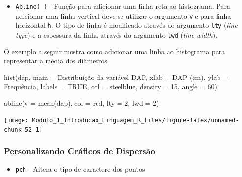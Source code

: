 \documentclass[
]{article}
\newenvironment{Shaded}{\begin{snugshade}}{\end{snugshade}}
\newcommand{\AttributeTok}[1]{\textcolor[rgb]{0.77,0.63,0.00}{#1}}
\newcommand{\ConstantTok}[1]{\textcolor[rgb]{0.00,0.00,0.00}{#1}}
\newcommand{\DecValTok}[1]{\textcolor[rgb]{0.00,0.00,0.81}{#1}}
\newcommand{\FunctionTok}[1]{\textcolor[rgb]{0.00,0.00,0.00}{#1}}
\newcommand{\NormalTok}[1]{#1}
\newcommand{\StringTok}[1]{\textcolor[rgb]{0.31,0.60,0.02}{#1}}
\providecommand{\tightlist}{%
  \setlength{\itemsep}{0pt}\setlength{\parskip}{0pt}}
\begin{document}
\begin{itemize}
\tightlist
\item
  \texttt{Abline(\ )} - Função para adicionar uma linha reta ao
  histograma. Para adicionar uma linha vertical deve-se utilizar o
  argumento \texttt{v} e para linha horizontal \texttt{h}. O tipo de
  linha é modificado através do argumento \texttt{lty} (\emph{line
  type}) e a espessura da linha através do argumento \texttt{lwd}
  (\emph{line width}).
\end{itemize}

O exemplo a seguir mostra como adicionar uma linha ao histograma para
representar a média dos diâmetros.

\begin{Shaded}
\begin{Highlighting}[]
\FunctionTok{hist}\NormalTok{(dap, }
     \AttributeTok{main =} \StringTok{\textquotesingle{}Distribuição da variável DAP\textquotesingle{}}\NormalTok{,}
    \AttributeTok{xlab =} \StringTok{\textquotesingle{}DAP (cm)\textquotesingle{}}\NormalTok{,}
    \AttributeTok{ylab =} \StringTok{\textquotesingle{}Frequência\textquotesingle{}}\NormalTok{,}
    \AttributeTok{labels =} \ConstantTok{TRUE}\NormalTok{,}
    \AttributeTok{col =} \StringTok{\textquotesingle{}steelblue\textquotesingle{}}\NormalTok{,}
    \AttributeTok{density =} \DecValTok{15}\NormalTok{,}
    \AttributeTok{angle =} \DecValTok{60}\NormalTok{)}

\FunctionTok{abline}\NormalTok{(}\AttributeTok{v =} \FunctionTok{mean}\NormalTok{(dap),}
       \AttributeTok{col =} \StringTok{\textquotesingle{}red\textquotesingle{}}\NormalTok{, }
       \AttributeTok{lty =} \DecValTok{2}\NormalTok{, }
       \AttributeTok{lwd =} \DecValTok{2}\NormalTok{)}
\end{Highlighting}
\end{Shaded}

\begin{center}\texttt{[image: Modulo\_1\_Introducao\_Linguagem\_R\_files/figure-latex/unnamed-chunk-52-1]} \end{center}

\hypertarget{personalizando-gruxe1ficos-de-dispersuxe3o}{%
\subsubsection{Personalizando Gráficos de
Dispersão}\label{personalizando-gruxe1ficos-de-dispersuxe3o}}

\begin{itemize}
\tightlist
\item
  \texttt{pch} - Altera o tipo de caractere dos pontos
\end{itemize}
\end{document}
